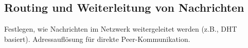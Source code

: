 \subsection{Routing und Weiterleitung von Nachrichten}

Festlegen, wie Nachrichten im Netzwerk weitergeleitet werden (z.B., DHT basiert).
Adressauflösung für direkte Peer-Kommunikation.